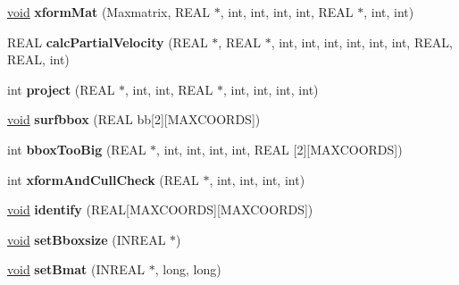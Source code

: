\begin{DoxyCompactItemize}
\item 
\mbox{\label{class_mapdesc_af08e80054ae907311c579a6d2fd6462f}} 
\hyperlink{interfacevoid}{void} {\bfseries xform\+Mat} (Maxmatrix, R\+E\+AL $\ast$, int, int, int, int, R\+E\+AL $\ast$, int, int)
\item 
\mbox{\label{class_mapdesc_aee7db366d2a88a4423d6e41513d9e2bb}} 
R\+E\+AL {\bfseries calc\+Partial\+Velocity} (R\+E\+AL $\ast$, R\+E\+AL $\ast$, int, int, int, int, int, int, R\+E\+AL, R\+E\+AL, int)
\item 
\mbox{\label{class_mapdesc_ab12fb73202bd905fb08735be19787e3f}} 
int {\bfseries project} (R\+E\+AL $\ast$, int, int, R\+E\+AL $\ast$, int, int, int, int)
\item 
\mbox{\label{class_mapdesc_ae92066fa1e4f2c2b70fd2dce6eee54af}} 
\hyperlink{interfacevoid}{void} {\bfseries surfbbox} (R\+E\+AL bb\mbox{[}2\mbox{]}\mbox{[}M\+A\+X\+C\+O\+O\+R\+DS\mbox{]})
\item 
\mbox{\label{class_mapdesc_a8b7fdf50150a1757f1d772a04ffe438a}} 
int {\bfseries bbox\+Too\+Big} (R\+E\+AL $\ast$, int, int, int, int, R\+E\+AL \mbox{[}2\mbox{]}\mbox{[}M\+A\+X\+C\+O\+O\+R\+DS\mbox{]})
\item 
\mbox{\label{class_mapdesc_a9d639a3bcfb892358b15e09256989ab3}} 
int {\bfseries xform\+And\+Cull\+Check} (R\+E\+AL $\ast$, int, int, int, int)
\item 
\mbox{\label{class_mapdesc_a8ce4aaf8137e3f25b72fcfff988e265e}} 
\hyperlink{interfacevoid}{void} {\bfseries identify} (R\+E\+AL\mbox{[}M\+A\+X\+C\+O\+O\+R\+DS\mbox{]}\mbox{[}M\+A\+X\+C\+O\+O\+R\+DS\mbox{]})
\item 
\mbox{\label{class_mapdesc_a30812ae4b5d2680850b354c041a8e38f}} 
\hyperlink{interfacevoid}{void} {\bfseries set\+Bboxsize} (I\+N\+R\+E\+AL $\ast$)
\item 
\mbox{\label{class_mapdesc_a67a3dea00443cac67db8751ea4c40f63}} 
\hyperlink{interfacevoid}{void} {\bfseries set\+Bmat} (I\+N\+R\+E\+AL $\ast$, long, long)
\item 

\end{DoxyCompactItemize}
